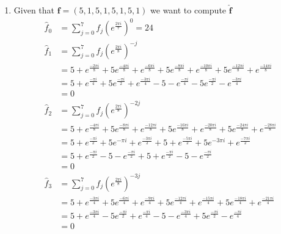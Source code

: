 \documentclass{report}
\begin{document}
\begin{solution}
	\begin{enumerate}[label=(\alph*)]
		\item  Given that $\bm f = \left(5,1,5,1,5,1,5,1\right) $ we want to compute $\hat{\bm f} $
		      \begin{align*}
			      \hat{f}_0 & = \sum_{j=0}^{7} f_{j} \left(e^{\frac{2\pi i}{7}}\right)^{0} = 24 \\
			      \hat{f}_1 & = \sum_{j=0}^{7} f_{j} \left(e^{\frac{2\pi i}{8}}\right)^{-j} \\
			                & =   5 + e^{\frac{-2\pi i}{8}} + 5e^{\frac{-4\pi i }{8}} + e^{\frac{-6\pi i }{8}} +5 e^{\frac{-8\pi i }{8}}
			      + e^{\frac{-10\pi i}{8}} + 5e^{\frac{-12\pi i}{8}} + e^{\frac{-14\pi i}{8}} \\
			                & =  5 + e^{\frac{-\pi i}{4}} + 5 e^{\frac{-\pi i }{2}} + e^{\frac{-3\pi i }{4}} -5
			      - e^{\frac{-\pi i}{4}} - 5e^{\frac{-\pi i}{2}} - e^{\frac{-3\pi i}{4}} \\
			                & = 0 \\
			      \hat{f}_2 & = \sum_{j=0}^{7} f_{j} \left(e^{\frac{2\pi i}{8}}\right)^{-2j} \\
			                & =   5 + e^{\frac{-4\pi i}{8}} + 5e^{\frac{-8\pi i }{8}} + e^{\frac{-12\pi i }{8}} +5 e^{\frac{-16\pi i }{8}}
			      + e^{\frac{-20\pi i}{8}} + 5e^{\frac{-24\pi i}{8}} + e^{\frac{-28\pi i}{8}} \\
			                & =  5 + e^{\frac{-\pi i}{2}} + 5 e^{-\pi i } + e^{\frac{-3\pi i }{2}} +5
			      + e^{\frac{-5\pi i}{2}} + 5e^{-3\pi i} + e^{\frac{-7\pi i}{2}} \\
			                & =  5 + e^{\frac{-\pi i}{2}} - 5  - e^{\frac{-\pi i }{2}} +5
			      + e^{\frac{-\pi i}{2}} - 5 - e^{\frac{-\pi i}{2}} \\
			                & = 0 \\
			      \hat{f}_3 & = \sum_{j=0}^{7} f_{j} \left(e^{\frac{2\pi i}{8}}\right)^{-3j} \\
			                & =   5 + e^{\frac{-3\pi i}{4}} + 5e^{\frac{-6\pi i }{4}} + e^{\frac{-9\pi i }{4}} +5 e^{\frac{-12\pi i }{4}}
			      + e^{\frac{-15\pi i}{4}} + 5e^{\frac{-18\pi i}{4}} + e^{\frac{-21\pi i}{4}} \\
			                & =  5 + e^{\frac{-3\pi i}{4}} - 5e^{\frac{-\pi i }{2}} + e^{\frac{-\pi i }{4}} -5
			      - e^{\frac{-3\pi i}{4}} + 5e^{\frac{-\pi i}{2}} - e^{\frac{-\pi i}{4}} \\
			                & =  0 \\

\end{align*}
\end{enumerate}
\end{solution}
\end{document}
